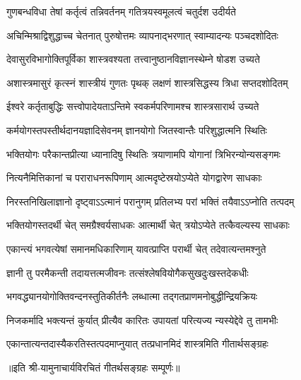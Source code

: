 \twolineshloka
{गुणबन्धविधा तेषां कर्तृत्वं तन्निवर्तनम्}
{गतित्रयस्वमूलत्वं चतुर्दश उदीर्यते}

\twolineshloka
{अचिन्मिश्राद्विशुद्धाच्च चेतनात् पुरुषोत्तमः}
{व्यापनाद्भरणात् स्वाम्यादन्यः पञ्चदशोदितः}

\twolineshloka
{देवासुरविभागोक्तिपूर्विका शास्त्रवश्यता}
{तत्त्वानुष्ठानविज्ञानस्थेम्ने षोडश उच्यते}

\twolineshloka
{अशास्त्रमासुरं कृत्स्नं शास्त्रीयं गुणतः पृथक्}
{लक्षणं शास्त्रसिद्धस्य त्रिधा सप्तदशोदितम्}

\twolineshloka
{ईश्वरे कर्तृताबुद्धिः सत्त्वोपादेयताऽन्तिमे}
{स्वकर्मपरिणामश्च शास्त्रसारार्थ उच्यते}

\twolineshloka
{कर्मयोगस्तपस्तीर्थदानयज्ञादिसेवनम्}
{ज्ञानयोगो जितस्वान्तैः परिशुद्धात्मनि स्थितिः}

\twolineshloka
{भक्तियोगः परैकान्तप्रीत्या ध्यानादिषु स्थितिः}
{त्रयाणामपि योगानां त्रिभिरन्योन्यसङ्गमः}

\twolineshloka
{नित्यनैमित्तिकानां च पराराधनरूपिणाम्}
{आत्मदृष्टेस्रयोऽप्येते योगद्वारेण साधकाः}

\twolineshloka
{निरस्तनिखिलाज्ञानो दृष्ट्वाऽऽत्मानं परानुगम्}
{प्रतिलभ्य परां भक्तिं तयैवाऽऽप्नोति तत्पदम्}

\twolineshloka
{भक्तियोगस्तदर्थी चेत् समग्रैश्वर्यसाधकः}
{आत्मार्थी चेत् त्रयोऽप्येते तत्कैवल्यस्य साधकाः}

\twolineshloka
{एकान्त्यं भगवत्येषां समानमधिकारिणाम्}
{यावत्प्राप्ति परार्थी चेत् तदेवात्यन्तमश्नुते}

\twolineshloka
{ज्ञानी तु परमैकन्ती तदायत्तत्मजीवनः}
{तत्संश्लेषवियोगैकसुखदुःखस्तदेकधीः}

\twolineshloka
{भगवद्\mbox{}ध्यानयोगोक्तिवन्दनस्तुतिकीर्तनैः}
{लब्धात्मा तद्गतप्राणमनोबुद्धीन्द्रियक्रियः}

\twolineshloka
{निजकर्मादि भक्त्यन्तं कुर्यात् प्रीत्यैव कारितः}
{उपायतां परित्यज्य न्यस्येद्देवे तु तामभीः}

\twolineshloka
{एकान्तात्यन्तदास्यैकरतिस्तत्पदमाप्नुयात्}
{तत्प्रधानमिदं शास्त्रमिति गीतार्थसङ्ग्रहः}

॥इति श्री-यामुनाचार्यविरचितं गीतर्थसङ्ग्रहः सम्पूर्णः॥